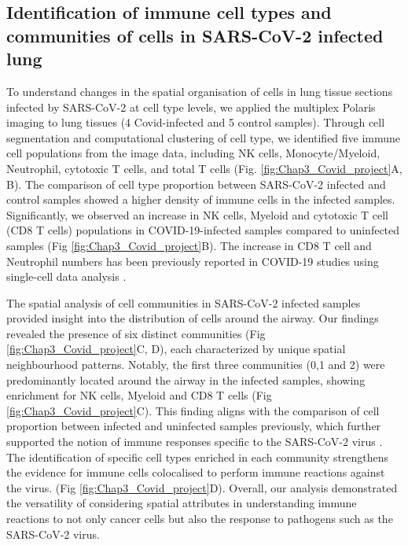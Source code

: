 \subsection{Identification of immune cell types and communities of cells in SARS-CoV-2 infected lung}
To understand changes in the spatial organisation of cells in lung tissue sections infected by SARS-CoV-2 at cell type levels, we applied the multiplex Polaris imaging to lung tissues (4 Covid-infected and 5 control samples). Through cell segmentation and computational clustering of cell type, we identified five immune cell populations from the image data,  including NK cells, Monocyte/Myeloid, Neutrophil, cytotoxic T cells, and total T cells (Fig. \ref{fig:Chap3_Covid_project}A, B). The comparison of cell type proportion between SARS-CoV-2 infected and control samples showed a higher density of immune cells in the infected samples. Significantly, we observed an increase in NK cells, Myeloid and cytotoxic T cell (CD8 T cells) populations in COVID-19-infected samples compared to uninfected samples (Fig \ref{fig:Chap3_Covid_project}B). The increase in CD8 T cell and Neutrophil numbers has been previously reported in COVID-19 studies using single-cell data analysis \cite{stephenson2021single}.  

The spatial analysis of cell communities in SARS-CoV-2 infected samples provided insight into the distribution of cells around the airway. Our findings revealed the presence of six distinct communities (Fig \ref{fig:Chap3_Covid_project}C, D), each characterized by unique spatial neighbourhood patterns. Notably, the first three communities (0,1 and 2) were predominantly located around the airway in the infected samples, showing enrichment for NK cells, Myeloid and CD8 T cells (Fig \ref{fig:Chap3_Covid_project}C). This finding aligns with the comparison of cell proportion between infected and uninfected samples previously, which further supported the notion of immune responses specific to the SARS-CoV-2 virus \cite{stephenson2021single}. The identification of specific cell types enriched in each community strengthens the evidence for immune cells colocalised to perform immune reactions against the virus. (Fig \ref{fig:Chap3_Covid_project}D). Overall, our analysis demonstrated the versatility of considering spatial attributes in understanding immune reactions to not only cancer cells but also the response to pathogens such as the SARS-CoV-2 virus. 

